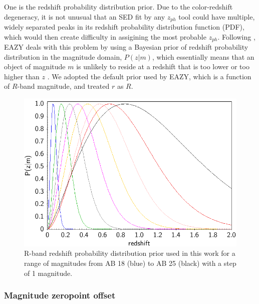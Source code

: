 \documentclass[apj,iop]{emulateapj}
\begin{document}
One is the redshift probability distribution prior. Due to the color-redshift degeneracy, it is not unusual that an SED fit by any $z_{ph}$ tool could have multiple, widely separated peaks in its redshift probability distribution function (PDF), which would then create difficulty in assigining the most probable $z_{ph}$. Following \citet[][]{Benitez2000}, EAZY deals with this problem by using a Bayesian prior of redshift probability distribution in the magnitude domain, $P(z|m)$, which essentially means that an object of magnitude $m$ is unlikely to reside at a redshift that is too lower or too higher than $z$ \citep[see \S 2.2 of][]{Brammer2008}. We adopted the default prior used by EAZY, which is a function of $R$-band magnitude, and treated $r$ as $R$.

\begin{figure}
\begin{minipage}{\columnwidth}
\includegraphics[width=\columnwidth,height=0.28\textheight]{figures/redshift_prior_18_25.png}
\caption{R-band redshift probability distribution prior used in this work for a range of magnitudes from AB 18 (blue) to AB 25 (black) with a step of 1 magnitude.}
\label{fig:redshift_prior}
\end{minipage}
\end{figure}

\subsubsection{Magnitude zeropoint offset}

\end{document}
